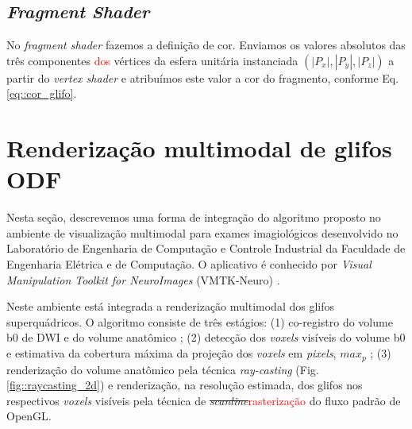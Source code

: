 
\subsection{\textit{Fragment Shader}}

No \textit{fragment shader} fazemos a definição de cor. Enviamos os valores absolutos das três componentes \textcolor{red}{dos} vértices da esfera unitária instanciada $(|P_x|, |P_y|, |P_z|)$ a partir do \textit{vertex shader} e atribuímos este valor a cor do fragmento, conforme Eq. \ref{eq::cor_glifo}.


\section{Renderização multimodal de glifos ODF}
\label{sec::superquadricas}

Nesta seção, descrevemos uma forma de integração do algoritmo proposto no 
ambiente de visualização multimodal para exames imagiológicos desenvolvido no Laboratório de Engenharia de Computação e Controle Industrial da Faculdade de Engenharia Elétrica e de Computação. O aplicativo é conhecido por \textit{Visual Manipulation Toolkit for NeuroImages} (VMTK-Neuro) \cite{VMTKNeuro}.

Neste ambiente está integrada a renderização multimodal dos glifos superquádricos. O algoritmo consiste de três estágios: (1) co-registro do volume b0 de DWI e do volume anatômico  \cite{ting2014}; (2) detecção dos \textit{voxels} visíveis do volume b0 e estimativa da cobertura máxima da projeção dos \textit{voxels} em \textit{pixels}, $max_p$ \cite{voltoline2021}; (3) renderização do volume anatômico pela técnica \textit{ray-casting} (Fig. \ref{fig::raycasting_2d}) \cite{kruger2003} e renderização, na resolução estimada, dos glifos nos respectivos \textit{voxels} visíveis pela técnica de \sout{\textit{scanline}}\textcolor{red}{rasterização} do fluxo padrão de OpenGL.

